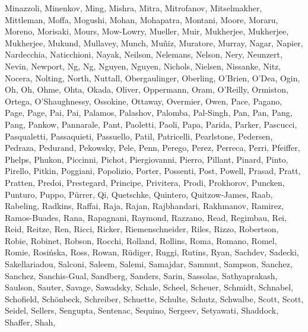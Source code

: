 \documentclass[times,tight]{aastex631}
\begin{document}
\begin{thebibliography}{}
{  {Minazzoli}, {Minenkov}, {Ming}, {Mishra}, {Mitra}, {Mitrofanov},
  {Mitselmakher}, {Mittleman}, {Moffa}, {Mogushi}, {Mohan}, {Mohapatra},
  {Montani}, {Moore}, {Moraru}, {Moreno}, {Morisaki}, {Mours}, {Mow-Lowry},
  {Mueller}, {Muir}, {Mukherjee}, {Mukherjee}, {Mukherjee}, {Mukund},
  {Mullavey}, {Munch}, {Mu{\~n}iz}, {Muratore}, {Murray}, {Nagar}, {Napier},
  {Nardecchia}, {Naticchioni}, {Nayak}, {Neilson}, {Nelemans}, {Nelson},
  {Nery}, {Neunzert}, {Nevin}, {Newport}, {Ng}, {Ng}, {Nguyen}, {Nguyen},
  {Nichols}, {Nielsen}, {Nissanke}, {Nitz}, {Nocera}, {Nolting}, {North},
  {Nuttall}, {Obergaulinger}, {Oberling}, {O'Brien}, {O'Dea}, {Ogin}, {Oh},
  {Oh}, {Ohme}, {Ohta}, {Okada}, {Oliver}, {Oppermann}, {Oram}, {O'Reilly},
  {Ormiston}, {Ortega}, {O'Shaughnessy}, {Ossokine}, {Ottaway}, {Overmier},
  {Owen}, {Pace}, {Pagano}, {Page}, {Page}, {Pai}, {Pai}, {Palamos},
  {Palashov}, {Palomba}, {Pal-Singh}, {Pan}, {Pan}, {Pang}, {Pang}, {Pankow},
  {Pannarale}, {Pant}, {Paoletti}, {Paoli}, {Papa}, {Parida}, {Parker},
  {Pascucci}, {Pasqualetti}, {Passaquieti}, {Passuello}, {Patil}, {Patricelli},
  {Pearlstone}, {Pedersen}, {Pedraza}, {Pedurand}, {Pekowsky}, {Pele}, {Penn},
  {Perego}, {Perez}, {Perreca}, {Perri}, {Pfeiffer}, {Phelps}, {Phukon},
  {Piccinni}, {Pichot}, {Piergiovanni}, {Pierro}, {Pillant}, {Pinard}, {Pinto},
  {Pirello}, {Pitkin}, {Poggiani}, {Popolizio}, {Porter}, {Possenti}, {Post},
  {Powell}, {Prasad}, {Pratt}, {Pratten}, {Predoi}, {Prestegard}, {Principe},
  {Privitera}, {Prodi}, {Prokhorov}, {Puncken}, {Punturo}, {Puppo},
  {P{\"u}rrer}, {Qi}, {Quetschke}, {Quintero}, {Quitzow-James}, {Raab},
  {Rabeling}, {Radkins}, {Raffai}, {Raja}, {Rajan}, {Rajbhandari}, {Rakhmanov},
  {Ramirez}, {Ramos-Buades}, {Rana}, {Rapagnani}, {Raymond}, {Razzano}, {Read},
  {Regimbau}, {Rei}, {Reid}, {Reitze}, {Ren}, {Ricci}, {Ricker},
  {Riemenschneider}, {Riles}, {Rizzo}, {Robertson}, {Robie}, {Robinet},
  {Robson}, {Rocchi}, {Rolland}, {Rollins}, {Roma}, {Romano}, {Romel}, {Romie},
  {Rosi{\'n}ska}, {Ross}, {Rowan}, {R{\"u}diger}, {Ruggi}, {Rutins}, {Ryan},
  {Sachdev}, {Sadecki}, {Sakellariadou}, {Salconi}, {Saleem}, {Salemi},
  {Samajdar}, {Sammut}, {Sampson}, {Sanchez}, {Sanchez}, {Sanchis-Gual},
  {Sandberg}, {Sanders}, {Sarin}, {Sassolas}, {Sathyaprakash}, {Saulson},
  {Sauter}, {Savage}, {Sawadsky}, {Schale}, {Scheel}, {Scheuer}, {Schmidt},
  {Schnabel}, {Schofield}, {Sch{\"o}nbeck}, {Schreiber}, {Schuette}, {Schulte},
  {Schutz}, {Schwalbe}, {Scott}, {Scott}, {Seidel}, {Sellers}, {Sengupta},
  {Sentenac}, {Sequino}, {Sergeev}, {Setyawati}, {Shaddock}, {Shaffer}, {Shah},
}
\end{thebibliography}
\end{document}
